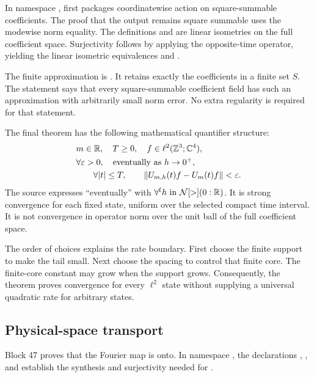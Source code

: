 In namespace ,  first packages coordinatewise action on square-summable coefficients. The proof that the output remains square summable uses the modewise norm equality. The definitions  and  are linear isometries on the full coefficient space. Surjectivity follows by applying the opposite-time operator, yielding the linear isometric equivalences  and .

The finite approximation is . It retains exactly the coefficients in a finite set \(S\). The statement  says that every square-summable coefficient field has such an approximation with arbitrarily small norm error. No extra regularity is required for that statement.

The final theorem  has the following mathematical quantifier structure:
\[
\begin{split}
 &m\in\mathbb R,\quad T\ge0,\quad f\in\ell^2(\mathbb Z^3;\mathbb C^4),\\
 &\forall\varepsilon>0,\quad\text{eventually as }h\to0^+,\\
 &\hspace{2em}\forall |t|\le T,\qquad
 \left\lVert U_{m,h}(t)f-U_m(t)f\right\rVert<\varepsilon.
\end{split}
\]
The source expresses ``eventually'' with $\forall^{\mathrm f}h\text{ in }\mathcal N[>](0:\mathbb R)$. It is strong convergence for each fixed state, uniform over the selected compact time interval. It is not convergence in operator norm over the unit ball of the full coefficient space.

The order of choices explains the rate boundary. First choose the finite support to make the tail small. Next choose the spacing to control that finite core. The finite-core constant may grow when the support grows. Consequently, the theorem proves convergence for every \(\ell^2\) state without supplying a universal quadratic rate for arbitrary states.

\subsection{Physical-space transport}

Block 47 proves that the Fourier map is onto. In namespace , the declarations , , and  establish the synthesis and surjectivity needed for .

